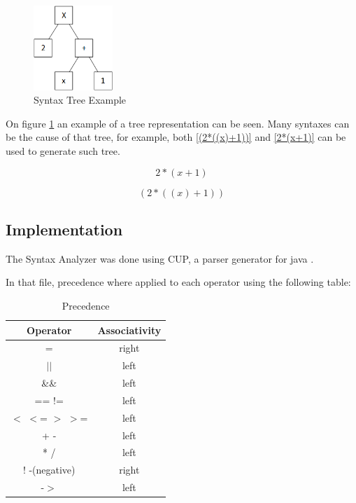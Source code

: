 \documentclass[conference]{IEEEtran}
\begin{document}
\begin{figure}[H]
	\centering
	\includegraphics[width=3cm]{images/syntax_tree.png}
	\caption{Syntax Tree Example}
	\label{fig_syntax_tree_example}
\end{figure}

On figure \ref{fig_syntax_tree_example} an example of a tree representation can be seen. Many syntaxes can be the cause of that tree, for example, both \ref{(2*((x)+1))} and \ref{2*(x+1)} can be used to generate such tree.

\begin{equation}
2*(x+1)
\label{2*(x+1)}
\end{equation}

\begin{equation}
(2*((x)+1))
\label{(2*((x)+1))}
\end{equation}

\subsection{Implementation}

The Syntax Analyzer was done using CUP, a parser generator for java \cite{CUP}.

In that file, precedence where applied to each operator using the following table:
\begin{table}[H]
	\begin{center}
	\begin{tabular}{||c c||}
		\hline
		Operator & Associativity  \\ [0.5ex] 
		\hline\hline
		= & right \\ 
		\hline
		$|$$|$ & left  \\
		\hline
		\&\& & left  \\
		\hline
		== != & left  \\
		\hline
		$<$ $<$= $>$ $>$= & left \\ [1ex] 
		\hline
		+ - & left \\
		\hline
		* / & left \\
		\hline
		! -(negative) & right \\
		\hline
		-$>$ & left \\
		\hline
	\end{tabular}
	\end{center}
	\caption{Precedence} \label{tab_precedence}
\end{table}
\end{document}
